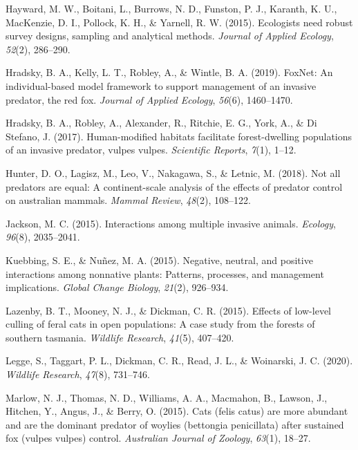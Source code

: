 \documentclass[]{elsarticle} %
\begin{document}
\leavevmode\hypertarget{ref-hayward2015}{}%
Hayward, M. W., Boitani, L., Burrows, N. D., Funston, P. J., Karanth, K. U., MacKenzie, D. I., Pollock, K. H., \& Yarnell, R. W. (2015). Ecologists need robust survey designs, sampling and analytical methods. \emph{Journal of Applied Ecology}, \emph{52}(2), 286--290.

\leavevmode\hypertarget{ref-hradsky2019foxnet}{}%
Hradsky, B. A., Kelly, L. T., Robley, A., \& Wintle, B. A. (2019). FoxNet: An individual-based model framework to support management of an invasive predator, the red fox. \emph{Journal of Applied Ecology}, \emph{56}(6), 1460--1470.

\leavevmode\hypertarget{ref-hradsky2017human}{}%
Hradsky, B. A., Robley, A., Alexander, R., Ritchie, E. G., York, A., \& Di Stefano, J. (2017). Human-modified habitats facilitate forest-dwelling populations of an invasive predator, vulpes vulpes. \emph{Scientific Reports}, \emph{7}(1), 1--12.

\leavevmode\hypertarget{ref-hunter2018}{}%
Hunter, D. O., Lagisz, M., Leo, V., Nakagawa, S., \& Letnic, M. (2018). Not all predators are equal: A continent-scale analysis of the effects of predator control on australian mammals. \emph{Mammal Review}, \emph{48}(2), 108--122.

\leavevmode\hypertarget{ref-jackson2015}{}%
Jackson, M. C. (2015). Interactions among multiple invasive animals. \emph{Ecology}, \emph{96}(8), 2035--2041.

\leavevmode\hypertarget{ref-kuebbing2015}{}%
Kuebbing, S. E., \& Nuñez, M. A. (2015). Negative, neutral, and positive interactions among nonnative plants: Patterns, processes, and management implications. \emph{Global Change Biology}, \emph{21}(2), 926--934.

\leavevmode\hypertarget{ref-lazenby2015}{}%
Lazenby, B. T., Mooney, N. J., \& Dickman, C. R. (2015). Effects of low-level culling of feral cats in open populations: A case study from the forests of southern tasmania. \emph{Wildlife Research}, \emph{41}(5), 407--420.

\leavevmode\hypertarget{ref-legge2020}{}%
Legge, S., Taggart, P. L., Dickman, C. R., Read, J. L., \& Woinarski, J. C. (2020). \emph{Wildlife Research}, \emph{47}(8), 731--746.

\leavevmode\hypertarget{ref-marlow2015}{}%
Marlow, N. J., Thomas, N. D., Williams, A. A., Macmahon, B., Lawson, J., Hitchen, Y., Angus, J., \& Berry, O. (2015). Cats (felis catus) are more abundant and are the dominant predator of woylies (bettongia penicillata) after sustained fox (vulpes vulpes) control. \emph{Australian Journal of Zoology}, \emph{63}(1), 18--27.
\end{document}
